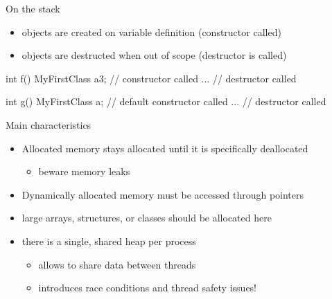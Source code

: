 \begin{frame}[fragile]
  \begin{block}{On the stack}
    \begin{itemize}
    \item objects are created on variable definition (constructor called)
    \item objects are destructed when out of scope (destructor is called)
    \end{itemize}
  \end{block}
  \begin{cppcode}
    int f() {
      MyFirstClass a{3}; // constructor called
      ...
    } // destructor called

    int g() {
      MyFirstClass a; // default constructor called
      ...
    }  // destructor called
  \end{cppcode}
\end{frame}

\begin{frame}[fragile]
  \begin{block}{Main characteristics}
    \begin{itemize}
    \item Allocated memory stays allocated until it is specifically deallocated
      \begin{itemize}
      \item beware memory leaks
      \end{itemize}
    \item Dynamically allocated memory must be accessed through pointers
    \item large arrays, structures, or classes should be allocated here
    \item there is a single, shared heap per process
      \begin{itemize}
      \item allows to share data between threads
      \item introduces race conditions and thread safety issues!
      \end{itemize}
    \end{itemize}
  \end{block}
\end{frame}

